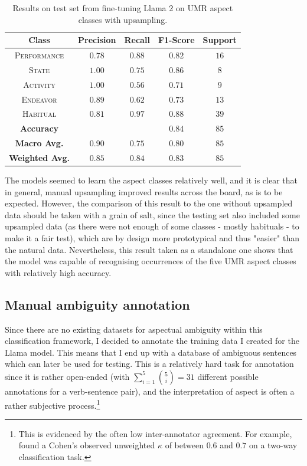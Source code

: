 \begin{table}
    \centering
    \begin{tabular}{|c|c|c|c|c|}\hline
        \textbf{Class} & \textbf{Precision} & \textbf{Recall} & \textbf{F1-Score} & \textbf{Support} \\ \hline
        \textsc{Performance} & $0.78$ & $0.88$ & $0.82$ & $16$\\ \hline
        \textsc{State} & $1.00$ & $0.75$ & $0.86$ & $8$\\\hline
        \textsc{Activity} & $1.00$ & $0.56$ & $0.71$ & $9$\\\hline
        \textsc{Endeavor} & $0.89$ & $0.62$ & $0.73$ & $13$\\\hline
        \textsc{Habitual} & $0.81$ & $0.97$ & $0.88$ & $39$\\ \hline \hline
        \textbf{Accuracy} &  &  & $0.84$ & $85$ \\ \hline
        \textbf{Macro Avg.} & $0.90$  & $0.75$ & $0.80$ & $85$ \\ \hline
        \textbf{Weighted Avg.} & $0.85$  & $0.84$ & $0.83$ & $85$ \\ \hline

    \end{tabular}
    \caption{Results on test set from fine-tuning Llama 2 on UMR aspect classes with upsampling.}
\end{table}
\label{llama_results_upsampling}

The models seemed to learn the aspect classes relatively well, and it is clear that in general, manual upsampling improved results across the board, as is to be expected. However, the comparison of this result to the one without upsampled data should be taken with a grain of salt, since the testing set also included some upsampled data (as there were not enough of some classes - mostly habituals - to make it a fair test), which are by design more prototypical and thus "easier" than the natural data. Nevertheless, this result taken as a standalone one shows that the model was capable of recognising occurrences of the five UMR aspect classes with relatively high accuracy.

\subsection{Manual ambiguity annotation}
\label{sect:manual_amb_annotation}
Since there are no existing datasets for aspectual ambiguity within this classification framework, I decided to annotate the training data I created for the Llama model. This means that I end up with a database of ambiguous sentences which can later be used for testing. This is a relatively hard task for annotation since it is rather open-ended (with $\sum_{i=1}^{5} \binom{5}{i}=31$ different possible annotations for a verb-sentence pair), and the interpretation of aspect is often a rather subjective process.\footnote{This is evidenced by the often low inter-annotator agreement. For example, \citet{Friedrich2014AutomaticPO} found a Cohen's observed unweighted $\kappa$ of between $0.6$ and $0.7$ on a two-way classification task.}


